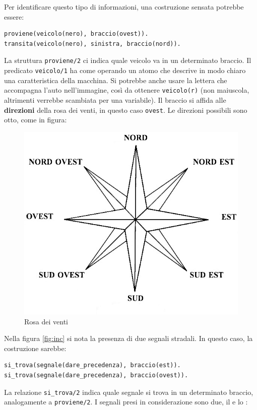 Per identificare questo tipo di informazioni, una costruzione sensata potrebbe essere:
\begin{verbatim}
proviene(veicolo(nero), braccio(ovest)).
transita(veicolo(nero), sinistra, braccio(nord)).
\end{verbatim}

La struttura \texttt{proviene/2} ci indica quale veicolo va in un determinato braccio. Il predicato \texttt{veicolo/1} ha come operando un atomo che descrive in modo chiaro una caratteristica della macchina. Si potrebbe anche usare la lettera che accompagna l'auto nell'immagine, così da ottenere \texttt{veicolo(r)} (non maiuscola, altrimenti verrebbe scambiata per una variabile). Il braccio si affida alle \textbf{direzioni} della rosa dei venti, in questo caso \texttt{ovest}. Le direzioni possibili sono otto, come in figura:

\begin{figure}[htb]
	\centering
	\includegraphics[width=.5\textwidth]{images/rose}
	\caption{Rosa dei venti}
	\label{fig:rose}
\end{figure}

Nella figura \ref{fig:inc} si nota la presenza di due segnali stradali. In questo caso, la costruzione sarebbe:
\begin{verbatim}
si_trova(segnale(dare_precedenza), braccio(est)).
si_trova(segnale(dare_precedenza), braccio(ovest)).
\end{verbatim}

La relazione \texttt{si\_trova/2} indica quale segnale si trova in un determinato braccio, analogamente a \texttt{proviene/2}. I segnali presi in considerazione sono due, il  e lo :

